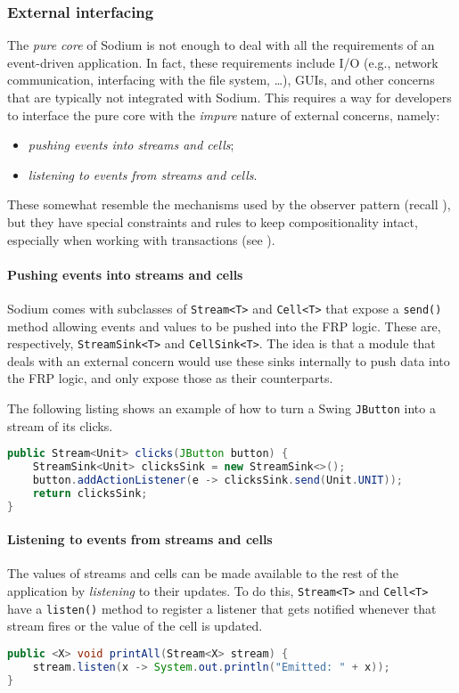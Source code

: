 \subsubsection{External interfacing}

The \textit{pure core} of Sodium is not enough to deal with all the requirements of an event-driven application.
%
In fact, these requirements include I/O (e.g., network communication, interfacing with the file system, \dots), GUIs, and other concerns that are typically not integrated with Sodium.
%
This requires a way for developers to interface the pure core with the \textit{impure} nature of external concerns, namely:
%
\begin{itemize}
    \item \textit{pushing events into streams and cells};
    \item \textit{listening to events from streams and cells}.
\end{itemize}
%
These somewhat resemble the mechanisms used by the observer pattern (recall ), but they have special constraints and rules to keep compositionality intact, especially when working with transactions (see ).

\paragraph{Pushing events into streams and cells}
Sodium comes with subclasses of \texttt{Stream<T>} and \texttt{Cell<T>} that expose a \texttt{send()} method allowing events and values to be pushed into the FRP logic.
%
These are, respectively, \texttt{StreamSink<T>} and \texttt{CellSink<T>}.
%
The idea is that a module that deals with an external concern would use these sinks internally to push data into the FRP logic, and only expose those as their  counterparts.

The following listing shows an example of how to turn a Swing \texttt{JButton} into a stream of its clicks.
%
\begin{lstlisting}[frame=single, language=java]
public Stream<Unit> clicks(JButton button) {
    StreamSink<Unit> clicksSink = new StreamSink<>();
    button.addActionListener(e -> clicksSink.send(Unit.UNIT));
    return clicksSink;
}
\end{lstlisting}

\paragraph{Listening to events from streams and cells}
The values of streams and cells can be made available to the rest of the application by \textit{listening} to their updates.
%
To do this, \texttt{Stream<T>} and \texttt{Cell<T>} have a \texttt{listen()} method to register a listener that gets notified whenever that stream fires or the value of the cell is updated.
%
\begin{lstlisting}[frame=single, language=java]
public <X> void printAll(Stream<X> stream) {
    stream.listen(x -> System.out.println("Emitted: " + x));
}
\end{lstlisting}

